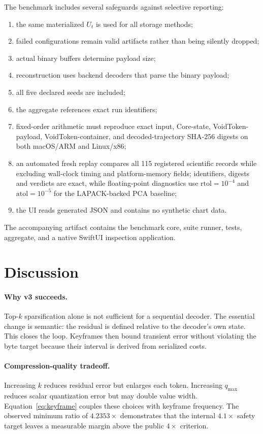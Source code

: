 \documentclass[10pt]{article}
\begin{document}
The benchmark includes several safeguards against selective reporting:
\begin{enumerate}[leftmargin=1.4em,itemsep=1pt]
  \item the same materialized $U_t$ is used for all storage methods;
  \item failed configurations remain valid artifacts rather than being silently
        dropped;
  \item actual binary buffers determine payload size;
  \item reconstruction uses backend decoders that parse the binary payload;
  \item all five declared seeds are included;
  \item the aggregate references exact run identifiers;
  \item fixed-order arithmetic must reproduce exact input, Core-state,
        VoidToken-payload, VoidToken-container, and decoded-trajectory SHA-256
        digests on both macOS/ARM and Linux/x86;
  \item an automated fresh replay compares all 115 registered scientific
        records while excluding wall-clock timing and platform-memory fields;
        identifiers, digests and verdicts are exact, while floating-point
        diagnostics use $\mathrm{rtol}=10^{-4}$ and
        $\mathrm{atol}=10^{-5}$ for the LAPACK-backed PCA baseline;
  \item the UI reads generated JSON and contains no synthetic chart data.
\end{enumerate}
The accompanying artifact contains the benchmark core, suite runner, tests,
aggregate, and a native SwiftUI inspection application.

\section{Discussion}

\paragraph{Why v3 succeeds.}
Top-$k$ sparsification alone is not sufficient for a sequential decoder.
The essential change is semantic: the residual is defined relative to the
decoder's own state. This closes the loop. Keyframes then bound transient error
without violating the byte target because their interval is derived from
serialized costs.

\paragraph{Compression-quality tradeoff.}
Increasing $k$ reduces residual error but enlarges each token. Increasing
$q_{\max}$ reduces scalar quantization error but may double value width.
Equation~\eqref{eq:keyframe} couples these choices with keyframe frequency.
The observed minimum ratio of $4.2353\times$ demonstrates that the internal
$4.1\times$ safety target leaves a measurable margin above the public
$4\times$ criterion.
\end{document}
